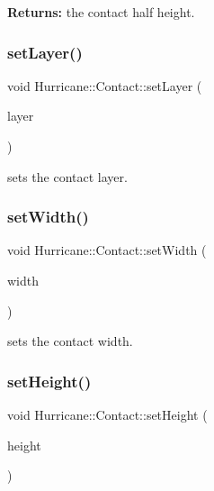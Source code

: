 {\bfseries Returns\+:} the contact half height. \mbox{\label{classHurricane_1_1Contact_aec627634d5b6cfc5079a02b1b518b50e}} 
\subsubsection{\texorpdfstring{set\+Layer()}{setLayer()}}
{\footnotesize\ttfamily void Hurricane\+::\+Contact\+::set\+Layer (\begin{DoxyParamCaption}\item[{const \mbox{\hyperlink{classHurricane_1_1Layer}{Layer}} $\ast$}]{layer }\end{DoxyParamCaption})}

sets the contact layer. \mbox{\label{classHurricane_1_1Contact_a08d14ce6cdf3696e472f4a621b936afe}} 
\subsubsection{\texorpdfstring{set\+Width()}{setWidth()}}
{\footnotesize\ttfamily void Hurricane\+::\+Contact\+::set\+Width (\begin{DoxyParamCaption}\item[{\mbox{\hyperlink{group__DbUGroup_ga4fbfa3e8c89347af76c9628ea06c4146}{Db\+U\+::\+Unit}}}]{width }\end{DoxyParamCaption})}

sets the contact width. \mbox{\label{classHurricane_1_1Contact_a6480b6a75cc098d3227f27080a2cb42b}} 
\subsubsection{\texorpdfstring{set\+Height()}{setHeight()}}
{\footnotesize\ttfamily void Hurricane\+::\+Contact\+::set\+Height (\begin{DoxyParamCaption}\item[{\mbox{\hyperlink{group__DbUGroup_ga4fbfa3e8c89347af76c9628ea06c4146}{Db\+U\+::\+Unit}}}]{height }\end{DoxyParamCaption})}

